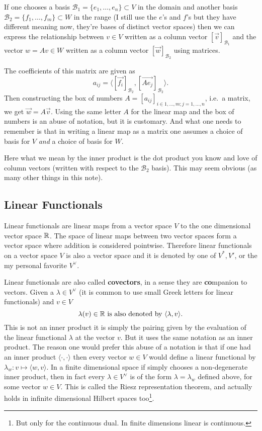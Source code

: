 \documentclass[12pt]{amsart}
\begin{document}
If one chooses a basis $\mathcal{B}_1 = \{e_1, \ldots, e_n\}\subset V$ in the domain and another basis $\mathcal{B}_2 = \{f_1, \ldots, f_m\} \subset W$ in the range (I still use the $e$'s and $f$'s but they have different meaning now, they're bases of distinct vector spaces) then we can express the relationship between $v \in V$ written as a column vector $[\vec{v}]_{\mathcal{B}_1}$ and the vector $w = Av \in W$ written as a column vector $[\vec{w}]_{\mathcal{B}_2}$ using matrices.

The coefficients of this matrix are given as
\[
	a_{ij} = \langle [\vec{f_i}]_{\mathcal{B}_2}, [\vec{A e_j}]_{\mathcal{B}_2} \rangle.
\]
Then constructing the box of numbers $A = [a_{ij}]_{i\in 1, \ldots, m; j = 1, \ldots, n}$, i.e.\ a matrix, we get $\vec{w} = A \vec{v}$. Using the same letter $A$ for the linear map and the box of numbers is an abuse of notation, but it is customary. And what one needs to remember is that in writing a linear map as a matrix one assumes a choice of basis for $V$ \emph{and} a choice of basis for $W$.

Here what we mean by the inner product is the dot product you know and love of column vectors (written with respect to the $\mathcal{B}_2$ basis). This may seem obvious (as many other things in this note).



\subsection*{Linear Functionals}

Linear functionals are linear maps from a vector space $V$ to the one dimensional vector space $\mathbb{R}$. The space of linear maps between two vector spaces form a vector space where addition is considered pointwise. Therefore linear functionals on a vector space $V$ is also a vector space and it is denoted by one of $V^*, V'$, or the my personal favorite $V^\vee$. 


Linear functionals are also called {\bf covectors},  in a sense they are {\bf co}mpanion to vectors. Given a $\lambda \in V^\vee$ (it is common to use small Greek letters for linear functionals) and $v \in V$ 
\begin{equation}\label{eq:pairing}
	\lambda(v) \in \mathbb{R} \text{ is also denoted by } \langle \lambda, v \rangle.
\end{equation} 
This is not an inner product it is simply the pairing given by the evaluation of the linear functional $\lambda$ at the vector $v$. But it uses the same notation as an inner product. The reason one would prefer this abuse of a notation is that if one had an inner product $\langle \cdot, \cdot \rangle $ then every vector $w\in V$ would define a linear functional by $\lambda_w : v \mapsto \langle w, v \rangle$. In a finite dimensional space if simply chooses a non-degenerate inner product, then in fact every $\lambda \in V^\vee$ is of the form $\lambda = \lambda_w$ defined above, for some vector $w \in V$. This is called the Riesz representation theorem, and actually holds in infinite dimensional Hilbert spaces too\footnote{But only for the continuous dual. In finite dimensions linear is continuous.}.
\end{document}
